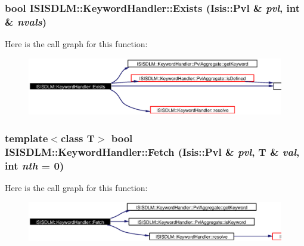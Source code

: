 \subsubsection{\setlength{\rightskip}{0pt plus 5cm}bool ISISDLM::Keyword\-Handler::Exists (Isis::Pvl \& {\em pvl}, int \& {\em nvals})}\label{classISISDLM_1_1KeywordHandler_a4}




Here is the call graph for this function:\begin{figure}[H]
\begin{center}
\leavevmode
\includegraphics[width=420pt]{classISISDLM_1_1KeywordHandler_a4_cgraph}
\end{center}
\end{figure}
\subsubsection{\setlength{\rightskip}{0pt plus 5cm}template$<$class T$>$ bool ISISDLM::Keyword\-Handler::Fetch (Isis::Pvl \& {\em pvl}, T \& {\em val}, int {\em nth} = 0)}\label{classISISDLM_1_1KeywordHandler_a8}




Here is the call graph for this function:\begin{figure}[H]
\begin{center}
\leavevmode
\includegraphics[width=400pt]{classISISDLM_1_1KeywordHandler_a8_cgraph}
\end{center}
\end{figure}
